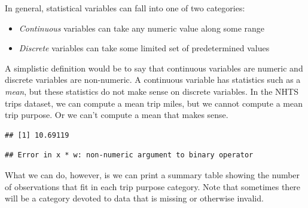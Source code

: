 \documentclass[
]{book}
\newenvironment{Shaded}{\begin{snugshade}}{\end{snugshade}}
\newcommand{\CommentTok}[1]{\textcolor[rgb]{0.56,0.35,0.01}{\textit{#1}}}
\newcommand{\KeywordTok}[1]{\textcolor[rgb]{0.13,0.29,0.53}{\textbf{#1}}}
\newcommand{\NormalTok}[1]{#1}
\newcommand{\OperatorTok}[1]{\textcolor[rgb]{0.81,0.36,0.00}{\textbf{#1}}}
\providecommand{\tightlist}{%
  \setlength{\itemsep}{0pt}\setlength{\parskip}{0pt}}
\begin{document}
In general, statistical variables can fall into one of two categories:

\begin{itemize}
\tightlist
\item
  \emph{Continuous} variables can take any numeric value along some range
\item
  \emph{Discrete} variables can take some limited set of predetermined values
\end{itemize}

A simplistic definition would be to say that continuous variables are numeric and
discrete variables are non-numeric. A continuous variable has statistics such as
a \emph{mean}, but these statistics do not make sense on discrete variables. In the
NHTS trips dataset, we can compute a mean trip miles, but we cannot compute
a mean trip purpose. Or we can't compute a mean that makes sense.

\begin{Shaded}
\end{Shaded}

\begin{verbatim}
## [1] 10.69119
\end{verbatim}

\begin{Shaded}
\end{Shaded}

\begin{verbatim}
## Error in x * w: non-numeric argument to binary operator
\end{verbatim}

What we can do, however, is we can print a summary table showing the number
of observations that fit in each trip purpose category. Note that sometimes there
will be a category devoted to data that is missing or otherwise invalid.

\begin{Shaded}
\end{Shaded}
\end{document}
